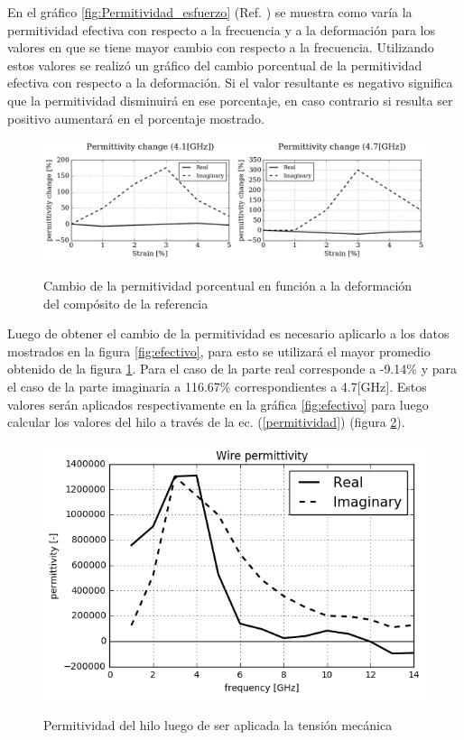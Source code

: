 \documentclass[12pt,letterpaper]{article}
\numberwithin{equation}{section}
\begin{document}
En el gráfico \ref{fig:Permitividad_esfuerzo} (Ref. \cite{Wire_backgound}) se muestra como varía la permitividad efectiva con respecto a la frecuencia y a la deformación para los valores en que se tiene mayor cambio con respecto a la frecuencia. Utilizando estos valores se realizó un gráfico del cambio porcentual de la permitividad efectiva con respecto a la deformación. Si el valor resultante es negativo significa que la permitividad disminuirá en ese porcentaje, en caso contrario si resulta ser positivo aumentará en el porcentaje mostrado.

\begin{figure}[H]
	\centering\includegraphics[scale=0.6]{Imagenes/permittivitychange.png}\\
	\caption{Cambio de la permitividad porcentual en función a la deformación del compósito de la referencia \cite{Wire_backgound} }
	\label{fig:permittivitychange}
\end{figure} 

Luego de obtener el cambio de la permitividad es necesario aplicarlo a los datos mostrados en la figura \ref{fig:efectivo}, para esto se utilizará el mayor promedio obtenido de la figura \ref{fig:permittivitychange}. Para el caso de la parte real corresponde a -9.14\% y para el caso de la parte imaginaria a 116.67\% correspondientes a  4.7[GHz]. Estos valores serán aplicados respectivamente en la gráfica \ref{fig:efectivo} para luego calcular los valores del hilo a través de la ec. (\ref{permitividad}) (figura \ref{fig:permittivitycstress}).

\begin{figure}[H]
	\centering\includegraphics[scale=1.]{Imagenes/wire_permittivity_stress.png}\\
	\caption{Permitividad del hilo luego de ser aplicada la tensión mecánica}
	\label{fig:permittivitycstress}
\end{figure} 
\end{document}
